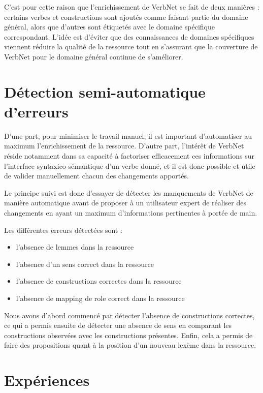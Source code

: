 
C'est pour cette raison que l'enrichissement de VerbNet se fait de deux
manières : certains verbes et constructions sont ajoutés comme faisant partie
du domaine général, alors que d'autres sont étiquetés avec le domaine
spécifique correspondant. L'idée est d'éviter que des connaissances de domaines
spécifiques viennent réduire la qualité de la ressource tout en s'assurant que
la couverture de VerbNet pour le domaine général continue de s'améliorer.

\section{Détection semi-automatique d'erreurs}

D'une part, pour minimiser le travail manuel, il est important d'automatiser au
maximum l'enrichissement de la ressource. D'autre part, l'intérêt de VerbNet
réside notamment dans sa capacité à factoriser efficacement ces informations
sur l'interface syntaxico-sémantique d'un verbe donné, et il est donc possible
et utile de valider manuellement chacun des changements apportés.

Le principe suivi est donc d'essayer de détecter les manquements de VerbNet de
manière automatique avant de proposer à un utilisateur expert de réaliser des
changements en ayant un maximum d'informations pertinentes à portée de main.

Les différentes erreurs détectées sont :
\begin{itemize}
    \item l'absence de lemmes dans la ressource
    \item l'absence d'un sens correct dans la ressource
    \item l'absence de constructions correctes dans la ressource
    \item l'absence de mapping de role correct dans la ressource
\end{itemize}

Nous avons d'abord commencé par détecter l'absence de constructions correctes,
ce qui a permis ensuite de détecter une absence de sens en comparant les
constructions observées avec les constructions présentes. Enfin, cela a permis
de faire des propositions quant à la position d'un nouveau lexème dans la
ressource.


\section{Expériences}


